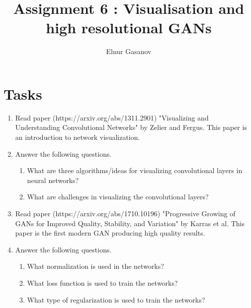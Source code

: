 \documentclass{article}
\title{Assignment 6 : Visualisation and high resolutional GANs}
\author{Elnur Gasanov}
\date{}
\begin{document}
\maketitle

\section{Tasks}

\begin{enumerate}
	\item Read paper (https://arxiv.org/abs/1311.2901) "Visualizing and Understanding Convolutional Networks" by Zelier and Fergus. This paper is an introduction to network visualization.
	\item Answer the following questions. \begin{enumerate} \item What are three algorithms/ideas for visualizing convolutional layers in neural networks? \item What are challenges in visualizing the convolutional layers? \end{enumerate}
	\item Read paper (https://arxiv.org/abs/1710.10196) "Progressive Growing of GANs for Improved Quality, Stability, and Variation" by Karras et al. This paper is the first modern GAN producing high quality results.
	\item Answer the following questions. \begin{enumerate} \item What normalization is used in the networks? \item What loss function is used to train the networks? \item What type of regularization is used to train the networks? \end{enumerate}
\end{enumerate}	
\end{document}
